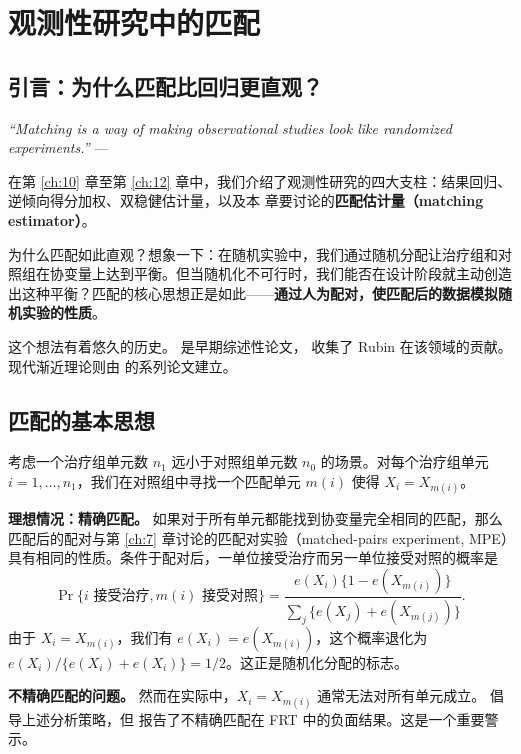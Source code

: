 
\chapter{观测性研究中的匹配}\label{ch:15}

\section{引言：为什么匹配比回归更直观？}\label{sec:15-intro}

\textit{``Matching is a way of making observational studies look like randomized experiments.''}
--- \citep{Rosenbaum:2002}

在第 \ref{ch:10} 章至第 \ref{ch:12} 章中，我们介绍了观测性研究的四大支柱：结果回归、逆倾向得分加权、双稳健估计量，以及本 章要讨论的\textbf{匹配估计量（matching estimator）}。

为什么匹配如此直观？想象一下：在随机实验中，我们通过随机分配让治疗组和对照组在协变量上达到平衡。但当随机化不可行时，我们能否在设计阶段就主动创造出这种平衡？匹配的核心思想正是如此——\textbf{通过人为配对，使匹配后的数据模拟随机实验的性质}。

这个想法有着悠久的历史。\citet{CochranRubin:1973} 是早期综述性论文，\citet{Rubin:2006b} 收集了 Rubin 在该领域的贡献。现代渐近理论则由 \citet{AbadieImbens:2006,AbadieImbens:2008,AbadieImbens:2011} 的系列论文建立。

\section{匹配的基本思想}\label{sec:15-basic-idea}

考虑一个治疗组单元数 $n_1$ 远小于对照组单元数 $n_0$ 的场景。对每个治疗组单元 $i = 1, \ldots, n_1$，我们在对照组中寻找一个匹配单元 $m(i)$ 使得 $X_i = X_{m(i)}$。

\textbf{理想情况：精确匹配。} 如果对于所有单元都能找到协变量完全相同的匹配，那么匹配后的配对与第 \ref{ch:7} 章讨论的匹配对实验（matched-pairs experiment, MPE）具有相同的性质。条件于配对后，一单位接受治疗而另一单位接受对照的概率是
\[
\Pr\{i \text{ 接受治疗}, m(i) \text{ 接受对照}\} = \frac{e(X_i) \{1 - e(X_{m(i)})\}}{\sum_{j} \{e(X_j) + e(X_{m(j)})\}} .
\]
由于 $X_i = X_{m(i)}$，我们有 $e(X_i) = e(X_{m(i)})$，这个概率退化为 $e(X_i) / \{e(X_i) + e(X_i)\} = 1/2$。这正是随机化分配的标志。

\textbf{不精确匹配的问题。} 然而在实际中，$X_i = X_{m(i)}$ 通常无法对所有单元成立。\citet{Rosenbaum:2002b} 倡导上述分析策略，但 \citet{GuoRothenhausler:2022} 报告了不精确匹配在 FRT 中的负面结果。这是一个重要警示。

